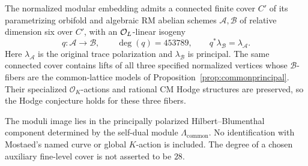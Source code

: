 \begin{theorem}\label{thm:principalfamily}
The normalized modular embedding admits a connected finite cover $C'$
of its parametrizing orbifold and algebraic RM abelian schemes
$\mathcal A,\mathcal B$ of relative dimension six over $C'$, with an
$\mathcal O_L$-linear isogeny
\[
 q:\mathcal A\longrightarrow\mathcal B,\qquad
 \deg(q)=453789,\qquad q^*\lambda_{\mathcal B}=\lambda_{\mathcal A}.
\]
Here $\lambda_{\mathcal A}$ is the original trace polarization and
$\lambda_{\mathcal B}$ is principal. The same connected cover contains
lifts of all three specified normalized vertices whose $\mathcal B$-fibers
are the common-lattice models of Proposition~\ref{prop:commonprincipal}.
Their specialized $\mathcal O_K$-actions and rational CM Hodge structures
are preserved, so the Hodge conjecture holds for these three fibers.

The moduli image lies in the principally polarized Hilbert--Blumenthal
component determined by the self-dual module $\Lambda_{\mathrm{common}}$.
No identification with Mostaed's named curve or global $K$-action is
included. The degree of a chosen auxiliary fine-level cover is not
asserted to be $28$.
\end{theorem}
